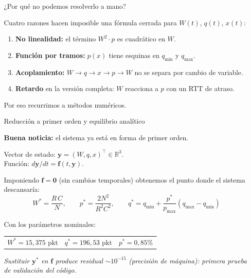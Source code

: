 \documentclass[10pt,aspectratio=169]{beamer}
\begin{document}
\begin{frame}{¿Por qué no podemos resolverlo a mano?}

Cuatro razones hacen imposible una fórmula cerrada para $W(t)$, $q(t)$, $x(t)$:

\vspace{0.5em}
\begin{enumerate}
\item \textbf{No linealidad:} el término $W^2 \cdot p$ es cuadrático en $W$.
\vspace{0.3em}
\item \textbf{Función por tramos:} $p(x)$ tiene esquinas en $q_{\min}$ y $q_{\max}$.
\vspace{0.3em}
\item \textbf{Acoplamiento:} $W \to q \to x \to p \to W$ no se separa por cambio de variable.
\vspace{0.3em}
\item \textbf{Retardo} en la versión completa: $W$ reacciona a $p$ con un RTT de atraso.
\end{enumerate}

\vspace{0.8em}
\centering
Por eso recurrimos a métodos numéricos.
\end{frame}

\begin{frame}{Reducción a primer orden y equilibrio analítico}

\textbf{Buena noticia:} el sistema ya está en forma de primer orden.
\vspace{0.3em}

Vector de estado: $\mathbf{y} = (W, q, x)^\top \in \mathbb{R}^3$.\\
Función: $d\mathbf{y}/dt = \mathbf{f}(t, \mathbf{y})$.

\vspace{0.7em}
Imponiendo $\mathbf{f} = \mathbf{0}$ (sin cambios temporales) obtenemos
el punto donde el sistema descansaría:
\[
\boxed{\; W^* = \frac{R\,C}{N}, \qquad p^* = \frac{2N^2}{R^2 C^2}, \qquad q^* = q_{\min} + \frac{p^*}{p_{\max}}(q_{\max}-q_{\min}) \;}
\]

\vspace{0.5em}
Con los parámetros nominales:
\begin{center}
\begin{tabular}{lll}
$W^* = 15{,}375$ pkt & \quad $q^* = 196{,}53$ pkt & \quad $p^* = 0{,}85\%$
\end{tabular}
\end{center}

\vspace{0.6em}
\small
\textit{Sustituir $\mathbf{y}^*$ en $\mathbf{f}$ produce residual $\sim 10^{-15}$
(precisión de máquina): primera prueba de validación del código.}
\end{frame}
\end{document}
